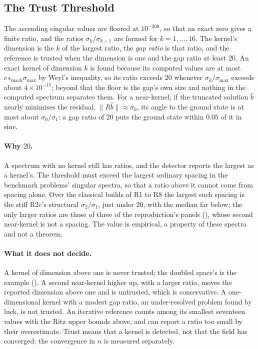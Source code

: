 \subsection{The Trust Threshold}
\label{app:trust-threshold}

The ascending singular values are floored at $10^{-300}$, so that an exact zero gives a finite ratio, and the ratios $\sigma_k/\sigma_{k-1}$ are formed for $k=1,\dots,16$. The kernel's dimension is the $k$ of the largest ratio, the \emph{gap ratio} is that ratio, and the reference is trusted when the dimension is one and the gap ratio at least $20$. An exact kernel of dimension $k$ is found because its computed values are at most $c\,\epsilon_{\mathrm{mach}}\sigma_{\max}$ by Weyl's inequality, so its ratio exceeds $20$ whenever $\sigma_k/\sigma_{\max}$ exceeds about $4\times10^{-15}$; beyond that the floor is the gap's own size and nothing in the computed spectrum separates them. For a near-kernel, if the truncated solution $\hat b$ nearly minimises the residual, $\|R\hat b\|\approx\sigma_0$, its angle to the ground state is at most about $\sigma_0/\sigma_1$: a gap ratio of $20$ puts the ground state within $0.05$ of it in sine.

\paragraph{Why $20$.} A spectrum with no kernel still has ratios, and the detector reports the largest as a kernel's. The threshold must exceed the largest ordinary spacing in the benchmark problems' singular spectra, so that a ratio above it cannot come from spacing alone. Over the classical builds of R1 to R8 the largest such spacing is the stiff R2c's structural $\sigma_2/\sigma_1$, just under $20$, with the median far below; the only larger ratios are those of three of the reproduction's panels (), whose second near-kernel is not a spacing. The value is empirical, a property of these spectra and not a theorem.

\paragraph{What it does not decide.} A kernel of dimension above one is never trusted; the doubled space's is the example (). A second near-kernel higher up, with a larger ratio, moves the reported dimension above one and is untrusted, which is conservative. A one-dimensional kernel with a modest gap ratio, an under-resolved problem found by luck, is not trusted. An iterative reference counts among its smallest seventeen values with the Ritz upper bounds above, and can report a ratio too small by their overestimate. Trust means that a kernel is detected, not that the field has converged; the convergence in $n$ is measured separately.

